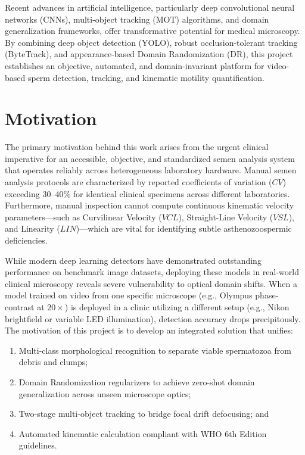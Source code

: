 \documentclass[12pt,a4paper]{report}
\begin{document}
Recent advances in artificial intelligence, particularly deep convolutional neural networks (CNNs), multi-object tracking (MOT) algorithms, and domain generalization frameworks, offer transformative potential for medical microscopy. By combining deep object detection (YOLO), robust occlusion-tolerant tracking (ByteTrack), and appearance-based Domain Randomization (DR), this project establishes an objective, automated, and domain-invariant platform for video-based sperm detection, tracking, and kinematic motility quantification.

\section{Motivation}
The primary motivation behind this work arises from the urgent clinical imperative for an accessible, objective, and standardized semen analysis system that operates reliably across heterogeneous laboratory hardware. Manual semen analysis protocols are characterized by reported coefficients of variation ($CV$) exceeding 30--40\% for identical clinical specimens across different laboratories. Furthermore, manual inspection cannot compute continuous kinematic velocity parameters---such as Curvilinear Velocity ($VCL$), Straight-Line Velocity ($VSL$), and Linearity ($LIN$)---which are vital for identifying subtle asthenozoospermic deficiencies.

While modern deep learning detectors have demonstrated outstanding performance on benchmark image datasets, deploying these models in real-world clinical microscopy reveals severe vulnerability to optical domain shifts. When a model trained on video from one specific microscope (e.g., Olympus phase-contrast at $20\times$) is deployed in a clinic utilizing a different setup (e.g., Nikon brightfield or variable LED illumination), detection accuracy drops precipitously. The motivation of this project is to develop an integrated solution that unifies:
\begin{enumerate}
    \item Multi-class morphological recognition to separate viable spermatozoa from debris and clumps;
    \item Domain Randomization regularizers to achieve zero-shot domain generalization across unseen microscope optics;
    \item Two-stage multi-object tracking to bridge focal drift defocusing; and
    \item Automated kinematic calculation compliant with WHO 6th Edition guidelines.
\end{enumerate}
\end{document}
